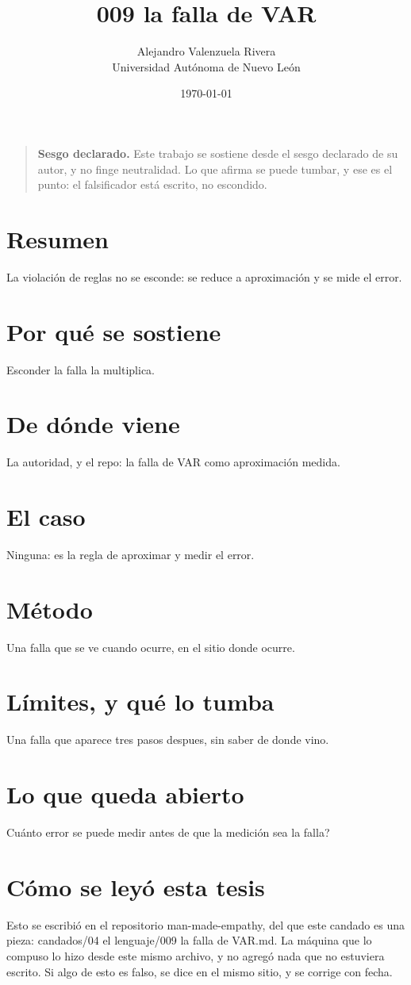 \documentclass[11pt,a4paper]{article}
\title{009 la falla de VAR}
\author{Alejandro Valenzuela Rivera\\\small Universidad Autónoma de Nuevo León}
\date{\today}
\begin{document}
\maketitle

\begin{quote}
\textbf{Sesgo declarado.} Este trabajo se sostiene desde el sesgo declarado de su autor, y no finge neutralidad. Lo que afirma se puede tumbar, y ese es el punto: el falsificador está escrito, no escondido.
\end{quote}

\section*{Resumen}
La violación de reglas no se esconde: se reduce a aproximación y se mide el error.

\section{Por qué se sostiene}
Esconder la falla la multiplica.

\section{De dónde viene}
La autoridad, y el repo: la falla de VAR como aproximación medida.

\section{El caso}
Ninguna: es la regla de aproximar y medir el error.

\section{Método}
Una falla que se ve cuando ocurre, en el sitio donde ocurre.

\section{Límites, y qué lo tumba}
Una falla que aparece tres pasos despues, sin saber de donde vino.

\section{Lo que queda abierto}
\textquestiondown{}Cuánto error se puede medir antes de que la medición sea la falla?

\section*{Cómo se leyó esta tesis}
Esto se escribió en el repositorio man-made-empathy, del que este candado es una pieza: candados/04 el lenguaje/009 la falla de VAR.md. La máquina que lo compuso lo hizo desde este mismo archivo, y no agregó nada que no estuviera escrito. Si algo de esto es falso, se dice en el mismo sitio, y se corrige con fecha.
\end{document}
